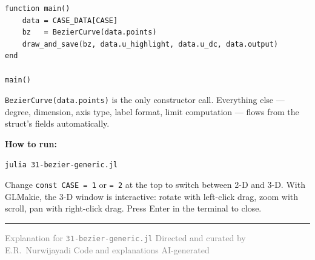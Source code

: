 \documentclass[12pt, a4paper]{article}
\newcommand{\cd}[1]{\texttt{#1}}
\begin{document}
\begin{verbatim}
function main()
    data = CASE_DATA[CASE]
    bz   = BezierCurve(data.points)
    draw_and_save(bz, data.u_highlight, data.u_dc, data.output)
end

main()
\end{verbatim}

\cd{BezierCurve(data.points)} is the only constructor call.
Everything else --- degree, dimension, axis type, label
format, limit computation --- flows from the struct's
fields automatically.

\begin{notebox}
\textbf{How to run:}
\begin{verbatim}
julia 31-bezier-generic.jl
\end{verbatim}
Change \cd{const CASE = 1} or \cd{= 2} at the top
to switch between 2-D and 3-D.
With GLMakie, the 3-D window is interactive:
rotate with left-click drag, zoom with scroll,
pan with right-click drag.
Press Enter in the terminal to close.
\end{notebox}

\vspace{2em}\hrule\vspace{0.5em}
{\small\textcolor{gray}{%
Explanation for \texttt{31-bezier-generic.jl}
\textbar{} Directed and curated by E.R.\ Nurwijayadi
\textbar{} Code and explanations AI-generated}}
\end{document}
